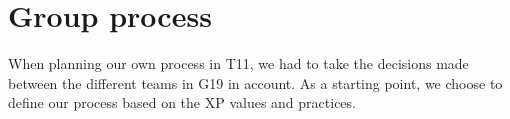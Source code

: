 \section{Group process}

When planning our own process in \gls{T11}, we had to take the decisions made between the different teams in \gls{G19} in account. 
As a starting point, we choose to define our process based on the \gls{XP} values and practices.
